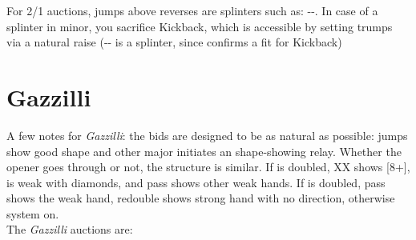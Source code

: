 \documentclass[12pt]{report}
\newcommand{\n}{\\}
\begin{document}
    For 2/1 auctions, jumps above reverses are splinters such as: --.  In case of a splinter in minor, you sacrifice Kickback, which is accessible by setting trumps via a natural raise (-- is a splinter, since  confirms a fit for Kickback)

\section{Gazzilli} \label{2:6}

    A few notes for \textit{Gazzilli}: the bids are designed to be as natural as possible: jumps show good shape and other major initiates an shape-showing relay.  Whether the opener goes through  or not, the structure is similar.  If  is doubled, XX shows [8+],  is weak with diamonds, and pass shows other weak hands.  If  is doubled, pass shows the weak hand, redouble shows strong hand with no direction, otherwise system on. \n

    The \textit{Gazzilli} auctions are:
\end{document}
